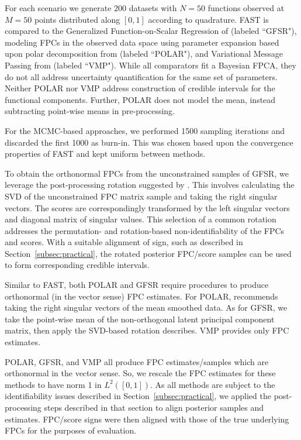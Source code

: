 \documentclass[12pt]{article}
\begin{document}
For each scenario we generate $200$ datasets with $N = 50$ functions observed at $M = 50$ points distributed along $[0,1]$ according to quadrature. FAST is compared to the Generalized Function-on-Scalar Regression of  \cite{goldsmith_generalized_2015} (labeled ``GFSR"), modeling FPCs in the observed data space using parameter expansion based upon polar decomposition from \cite{jauch_monte_2021} (labeled ``POLAR"), and Variational Message Passing from \cite{nolan_bayesian_2023} (labeled ``VMP"). While all comparators fit a Bayesian FPCA, they do not all address uncertainty quantification for the same set of parameters. Neither POLAR nor VMP address construction of credible intervals for the functional components. Further, POLAR does not model the mean, instead subtracting point-wise means in pre-processing. 

For the MCMC-based approaches, we performed 1500 sampling iterations and discarded the first 1000 as burn-in. This was chosen based upon the convergence properties of FAST and kept uniform between methods. 

To obtain the orthonormal FPCs from the unconstrained samples of GFSR, we leverage the post-processing rotation suggested by \cite {goldsmith_generalized_2015}. This involves calculating the SVD of the unconstrained FPC matrix sample and taking the right singular vectors. The scores are correspondingly transformed by the left singular vectors and diagonal matrix of singular values. This selection of a common rotation addresses the permutation- and rotation-based non-identifiability of the FPCs and scores. With a suitable alignment of sign, such as described in Section~\ref{subsec:practical}, the rotated posterior FPC/score samples can be used to form corresponding credible intervals.

Similar to FAST, both POLAR and GFSR require procedures to produce orthonormal (in the vector sense) FPC estimates. For POLAR, \cite{jauch_monte_2021} recommends taking the right singular vectors of the mean smoothed data. As for GFSR, we take the point-wise mean of the non-orthogonal latent principal component matrix, then apply the SVD-based rotation \cite{goldsmith_generalized_2015} describes. VMP provides only FPC estimates. 

POLAR, GFSR, and VMP all produce FPC estimates/samples which are orthonormal in the vector sense. So, we rescale the FPC estimates for these methods to have norm 1 in $L^2([0,1])$. As all methods are subject to the identifiability issues described in Section~\ref{subsec:practical}, we applied the post-processing steps described in that section to align posterior samples and estimates. FPC/score signs were then aligned with those of the true underlying FPCs for the purposes of evaluation. 
\end{document}
